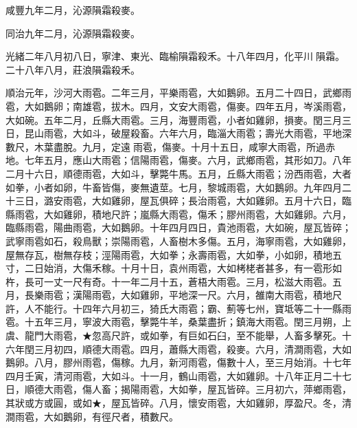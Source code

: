 \begin{pinyinscope}
咸豐九年二月，沁源隕霜殺麥。

同治九年二月，沁源隕霜殺麥。

光緒二年八月初八日，寧津、東光、臨榆隕霜殺禾。十八年四月，化平川隕霜。二十八年八月，莊浪隕霜殺禾。

順治元年，沙河大雨雹。二年三月，平樂雨雹，大如鵝卵。五月二十四日，武鄉雨雹，大如鵝卵；南雄雹，拔木。四月，文安大雨雹，傷麥。四年五月，岑溪雨雹，大如碗。五年二月，丘縣大雨雹。三月，海豐雨雹，小者如雞卵，損麥。閏三月三日，昆山雨雹，大如斗，破屋殺畜。六年六月，臨淄大雨雹；壽光大雨雹，平地深數尺，木葉盡脫。九月，定遠雨雹，傷麥。十月十五日，咸寧大雨雹，所過赤地。七年五月，應山大雨雹；信陽雨雹，傷麥。六月，武鄉雨雹，其形如刀。八年二月十六日，順德雨雹，大如斗，擊斃牛馬。五月，丘縣大雨雹；汾西雨雹，大者如拳，小者如卵，牛畜皆傷，麥無遺莖。七月，黎城雨雹，大如鵝卵。九年四月二十三日，潞安雨雹，大如雞卵，屋瓦俱碎；長治雨雹，大如雞卵。五月十六日，臨縣雨雹，大如雞卵，積地尺許；嵐縣大雨雹，傷禾；膠州雨雹，大如雞卵。六月，臨縣雨雹，陽曲雨雹，大如鵝卵。十年四月四日，貴池雨雹，大如碗，屋瓦皆碎；武寧雨雹如石，殺鳥獸；崇陽雨雹，人畜樹木多傷。五月，海寧雨雹，大如雞卵，屋無存瓦，樹無存枝；涇陽雨雹，大如拳；永壽雨雹，大如拳，小如卵，積地五寸，二日始消，大傷禾稼。十月十日，袁州雨雹，大如栲栳者甚多，有一雹形如杵，長可一丈一尺有奇。十一年二月十五，蒼梧大雨雹。三月，松滋大雨雹。五月，長樂雨雹；漢陽雨雹，大如雞卵，平地深一尺。六月，雒南大雨雹，積地尺許，人不能行。十四年六月初三，猗氏大雨雹；霸、薊等七州，寶坻等二十一縣雨雹。十五年三月，寧波大雨雹，擊斃牛羊，桑葉盡折；鎮海大雨雹。閏三月朔，上虞、龍門大雨雹，★忽高尺許，或如拳，有巨如石臼，至不能舉，人畜多擊死。十六年閏三月初四，順德大雨雹。四月，蕭縣大雨雹，殺麥。六月，清澗雨雹，大如鵝卵。八月，膠州雨雹，傷稼。九月，新河雨雹，傷數十人，至三月始消。十七年四月壬寅，清河雨雹，大如斗。十一月，鶴山雨雹，大如雞卵。十八年正月二十七日，順德大雨雹，傷人畜；揭陽雨雹，大如拳，屋瓦皆碎。三月初六，萍鄉雨雹，其狀或方或圓，或如★，屋瓦皆碎。八月，懷安雨雹，大如雞卵，厚盈尺。冬，清澗雨雹，大如鵝卵，有徑尺者，積數尺。


\end{pinyinscope}
